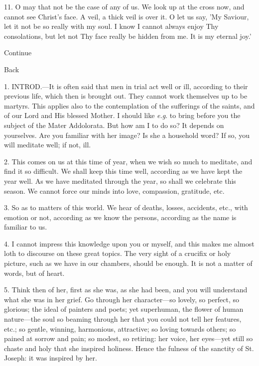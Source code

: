 11. O may that not be the case of any of us. We
look up at the cross now, and cannot see Christ's face. A veil, a
thick veil is over it. O let us say, 'My Saviour, let it not be
so really with my soul. I know I cannot always enjoy Thy consolations,
but let not Thy face really be hidden from me. It is my eternal joy.'

Continue

Back


1. INTROD.—It
is often said that men in trial act well or ill, according to their
previous life, which then is brought out. They cannot work themselves
up to be martyrs. This applies also to the contemplation of the
sufferings of the saints, and of our Lord and His blessed Mother. I
should like \emph{e.g}. to bring before you the subject of the Mater
Addolorata. But how am I to do so? It depends on yourselves. Are you
familiar with her image? Is she a household word? If so, you will
meditate well; if not, ill.

2. This comes on us at this time of year, when we
wish so much to meditate, and find it so difficult. We shall keep this
time well, according as we have kept the year well. As we have
meditated through the year, so shall we celebrate this season. We
cannot force our minds into love, compassion, gratitude, etc.

3. So as to matters of this world. We hear of
deaths, losses, accidents, etc., with emotion or not, according as we
know the persons, according as the name is familiar to us.

4. I cannot impress this knowledge upon you or
myself, and this makes me almost loth to discourse on these great
topics. The very sight of a crucifix or holy picture, such as we have
in our chambers, should be enough. It is not a matter of words, but of
heart.

5. Think then of her, first as she was, as she
had been, and you will understand what she was in her grief. Go
through her character—so lovely, so perfect, so glorious; the ideal
of painters and poets; yet superhuman, the flower of human
nature—the soul so beaming through her that you could not tell her
features, etc.; so gentle, winning, harmonious, attractive; so loving
towards others; so pained at sorrow and pain; so modest, so retiring:
her voice, her eyes—yet still so chaste and holy that she inspired
holiness. Hence the fulness of the sanctity of St. Joseph: it was
inspired by her.

